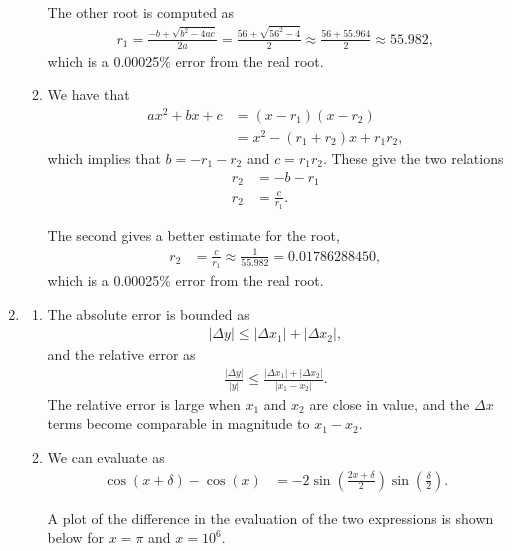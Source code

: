 \documentclass[10pt]{article}
\begin{document}
\begin{enumerate}
\begin{enumerate}
    The other root is computed as \begin{align*}
        r_1 = \frac{-b + \sqrt{b^2-4ac}}{2a} = \frac{56 + \sqrt{56^2 - 4}}{2} \approx \frac{56 + 55.964}{2} \approx 55.982,
    \end{align*} which is a 0.00025\% error from the real root.

    \item We have that \begin{align*}
        ax^2 + bx + c &= (x-r_1)(x-r_2) \\
        &= x^2 - (r_1+r_2)x+r_1r_2,
    \end{align*} which implies that \(b=-r_1-r_2\) and \(c=r_1r_2\). These give the two relations \begin{align*}
        r_2 &= -b - r_1 \\
        r_2 &= \frac{c}{r_1}.
    \end{align*}

    The second gives a better estimate for the root, \begin{align*}
        r_2 &= \frac{c}{r_1} \approx \frac{1}{55.982} = 0.01786288450,
    \end{align*} which is a 0.00025\% error from the real root.
    \end{enumerate}

    \item \begin{enumerate}
        \item The absolute error is bounded as \begin{align*}
            |\Delta y| \leq |\Delta x_1| + |\Delta x_2|,
        \end{align*} and the relative error as \begin{align*}
            \frac{|\Delta y|}{|y|} \leq \frac{|\Delta x_1| + |\Delta x_2|}{|x_1-x_2|}.
        \end{align*} The relative error is large when \(x_1\) and \(x_2\) are close in value, and the \(\Delta x\) terms become comparable in magnitude to \(x_1-x_2\).
        \item We can evaluate as \begin{align}\label{eq:eval_1}
            \cos(x+\delta ) - \cos  (x) &= -2\sin \left( \frac{2x+\delta }{2} \right)\sin  \left( \frac{\delta}{2} \right).
        \end{align}

        A plot of the difference in the evaluation of the two expressions is shown below for \(x=\pi\) and \(x=10^6\).


\end{enumerate}
\end{enumerate}
\end{document}
